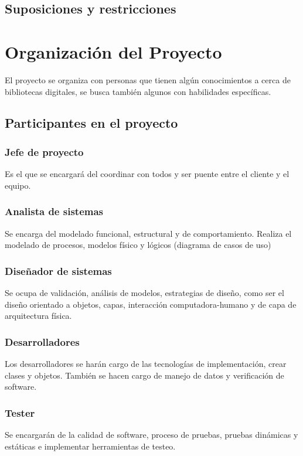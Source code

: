 \section{Suposiciones y restricciones}
\chapter*{Organización del Proyecto}%
El proyecto se organiza con personas que tienen algún conocimientos a cerca de bibliotecas digitales, se busca también algunos con habilidades específicas. 


\section{Participantes en el proyecto}
\subsection{Jefe de proyecto} Es el que se encargará del coordinar con todos y ser puente entre el cliente y el equipo.
\subsection{Analista de sistemas} 
Se encarga del modelado funcional, estructural y de comportamiento.
Realiza el modelado de procesos, modelos físico y lógicos (diagrama de casos de uso) 
\subsection{Diseñador  de sistemas} 
Se ocupa de validación, análisis de modelos, estrategias de diseño, como ser el diseño orientado a objetos, capas, interacción computadora-humano y de capa de arquitectura física. 
\subsection{Desarrolladores}
Los desarrolladores se harán cargo de las tecnologías de implementación, crear clases y objetos. También se hacen cargo de manejo de datos y verificación de software. 
\subsection{Tester}
Se encargarán de la calidad de software, proceso de pruebas, pruebas dinámicas y estáticas e implementar herramientas de testeo.
